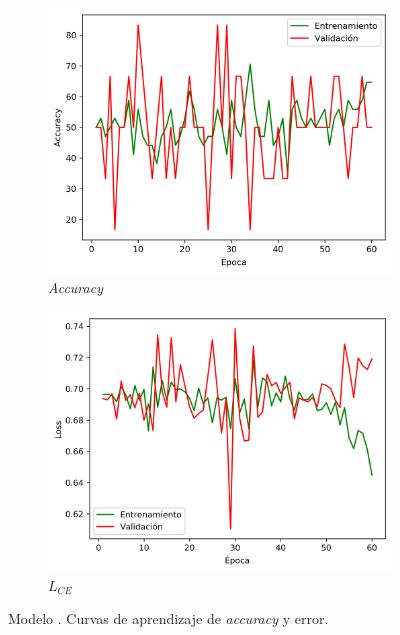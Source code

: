 \begin{figure}[h]
    \begin{subfigure}{0.5\linewidth}
        \centering
        \includegraphics[width=\linewidth]{imagenes/experiments/Nodule-50_Accuracy.png}
        \caption{\textit{Accuracy}}
        \label{subfig:acc_Nodule-50-30K-5}
    \end{subfigure}
    \begin{subfigure}{0.5\linewidth}
        \centering
        \includegraphics[width=\linewidth]{imagenes/experiments/Nodule-50_Loss.png}
        \caption{$L_{CE}$}
        \label{subfig:loss_Nodule-50-30K-5}
    \end{subfigure}
    \caption[Nodule-50-30K-5: Curvas de aprendizaje]{Modelo . Curvas de aprendizaje de \textit{accuracy} y error.}
    \label{fig:nodule-50-30K-5}
\end{figure}


